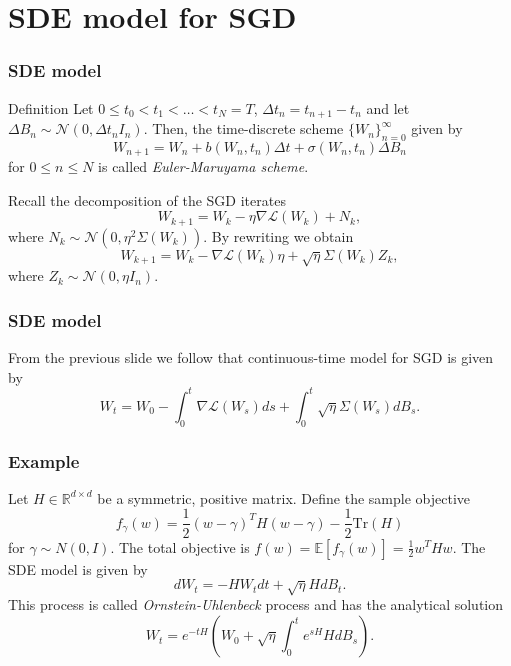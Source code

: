 \documentclass[17pt,institute=e10]{tuhh_presentation}
\newcommand{\CL}{\mathcal{L}}
\newcommand{\E}[1]{\mathbb{E}\left[{#1} \right]}
\begin{document}
\section{SDE model for SGD}
\begin{frame}
  \frametitle{SDE model}
  \begin{block}{Definition \autocite{kloedenNumericalSolutionStochastic2013}}
    Let $0 \leq t_0 < t_1 < \dots < t_N = T$, $\Delta t_n = t_{n+1} - t_n$ and let $\Delta B_n \sim \mathcal{N}(0,\Delta t_n I_n)$. Then, the time-discrete scheme $\{W_n\}_{n=0}^\infty$ given by
\begin{equation*}
  W_{n+1} = W_n + b(W_n, t_n)\Delta t + \sigma(W_n, t_n) \Delta B_n
\end{equation*}
for $0 \leq n \leq N$ is called \emph{\textcolor{purple-pontifex}{Euler-Maruyama scheme}}.
  \end{block}
  Recall the decomposition of the SGD iterates
  \begin{equation*}
    W_{k+1} = W_k - \eta \nabla \CL(W_k) + N_k,
  \end{equation*}
  where $N_k \sim \mathcal{N}(0, \eta^2\Sigma(W_k))$. By rewriting we obtain
  \begin{equation*}
    W_{k+1} = W_k - \nabla \CL(W_k) \eta + \sqrt{\eta}\Sigma(W_k) Z_k,
  \end{equation*}
  where $Z_k \sim \mathcal{N}(0, \eta I_n)$.
\end{frame}
\begin{frame}
  \frametitle{SDE model}
  From the previous slide we follow that \textcolor{purple-pontifex}{continuous-time} model for SGD is given by
  \begin{equation*}
    W_t = W_0 - \int_0^t \nabla \CL(W_s) ds + \int_0^t \sqrt{\eta} \Sigma(W_s) dB_s.
  \end{equation*}
\end{frame}
\begin{frame}
  \frametitle{Example \autocite{liStochasticModifiedEquations2019}}
  Let $H \in \mathbb{R}^{d\times d}$ be a symmetric, positive matrix. Define the sample objective 
\begin{equation*}
  f_{\gamma}(w) = \frac{1}{2} (w - \gamma)^T H (w - \gamma) - \frac{1}{2} \text{Tr}(H)
\end{equation*}
for $\gamma \sim N(0,I)$. The total objective is $f(w) = \E{f_{\gamma}(w)} = \frac{1}{2} w^T H w$.
The SDE model is given by
\begin{equation*}
  dW_t = -H W_t dt + \sqrt{\eta}H dB_t.
\end{equation*}
This process is called \emph{Ornstein-Uhlenbeck} process and has the analytical solution
\begin{equation*}
  W_t = e^{-t H}(W_0 + \sqrt{\eta}\int_0^te^{s H}H dB_s).
\end{equation*}
\end{frame}
\end{document}
